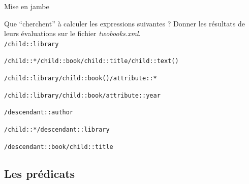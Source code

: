 \begin{frame}{Mise en jambe}

\begin{small}

\begin{exoblock}
Que ``cherchent'' à calculer les expressions suivantes ? Donner les résultats de leurs évaluations sur le fichier \textit{twobooks.xml}.\\

\verb?/child::library?

\verb?/child::*/child::book/child::title/child::text()? 

\verb?/child::library/child::book()/attribute::*?	

\verb?/child::library/child::book/attribute::year?	

\verb?/descendant::author? 


\verb?/child::*/descendant::library? 

\verb?/descendant::book/child::title? 

\end{exoblock}

\end{small}


\end{frame}


\subsection{Les prédicats}

